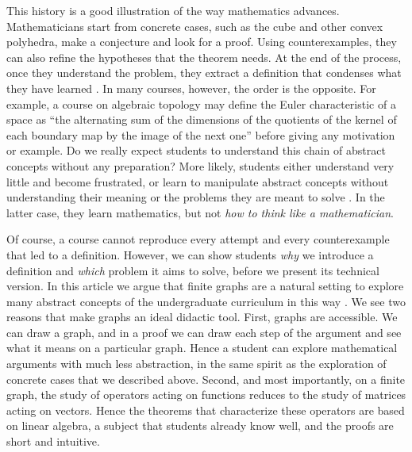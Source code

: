 \documentclass[11pt,a4paper]{article}
\theoremstyle{plain}
\theoremstyle{definition}
\begin{document}
This history is a good illustration of the way mathematics advances. Mathematicians start from concrete cases, such as the cube and other convex polyhedra, make a conjecture and look for a proof. Using counterexamples, they can also refine the hypotheses that the theorem needs. At the end of the process, once they understand the problem, they extract a definition that condenses what they have learned \cite{lakatos1976}. In many courses, however, the order is the opposite. For example, a course on algebraic topology may define the Euler characteristic of a space as ``the alternating sum of the dimensions of the quotients of the kernel of each boundary map by the image of the next one'' before giving any motivation or example. Do we really expect students to understand this chain of abstract concepts without any preparation? More likely, students either understand very little and become frustrated, or learn to manipulate abstract concepts without understanding their meaning or the problems they are meant to solve \cite{skemp1976}. In the latter case, they learn mathematics, but not \emph{how to think like a mathematician}.

Of course, a course cannot reproduce every attempt and every counterexample that led to a definition. However, we can show students \emph{why} we introduce a definition and \emph{which} problem it aims to solve, before we present its technical version. In this article we argue that finite graphs are a natural setting to explore many abstract concepts of the undergraduate curriculum in this way \cite{doyle1984,lim2020,knill2012,grady2010}. We see two reasons that make graphs an ideal didactic tool. First, graphs are accessible. We can draw a graph, and in a proof we can draw each step of the argument and see what it means on a particular graph. Hence a student can explore mathematical arguments with much less abstraction, in the same spirit as the exploration of concrete cases that we described above. Second, and most importantly, on a finite graph, the study of operators acting on functions reduces to the study of matrices acting on vectors. Hence the theorems that characterize these operators are based on linear algebra, a subject that students already know well, and the proofs are short and intuitive.
\end{document}
